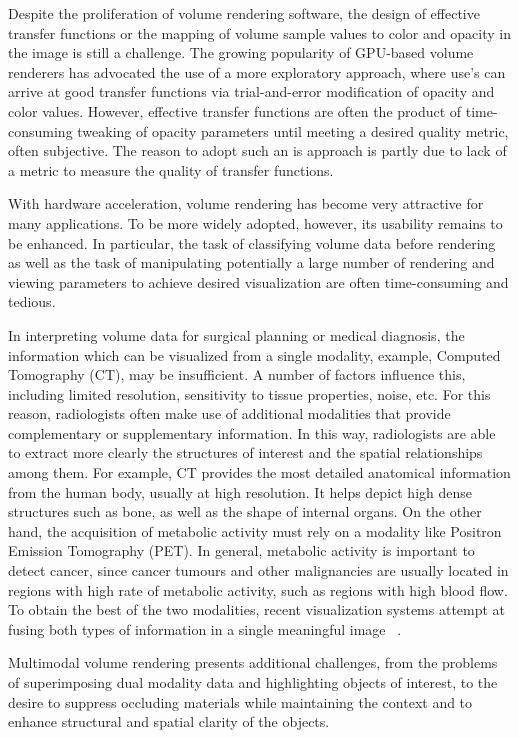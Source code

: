 Despite the proliferation of volume rendering software, the design of effective transfer functions or the mapping of volume sample values to color and opacity in the image is still a challenge. The growing popularity of GPU-based volume renderers has advocated the use of a more exploratory approach, where use\rq s can arrive at good transfer functions via trial-and-error modification of opacity and color values. However, effective transfer functions are often the product of time-consuming tweaking of opacity parameters until meeting a desired quality metric, often subjective. The reason to adopt such an is approach is partly due to lack of a metric to measure the quality of transfer functions. 

With hardware acceleration, volume rendering has become very attractive for many applications. To be more widely adopted, however, its usability remains to be enhanced. In particular, the task of classifying volume data before rendering as well as the task of manipulating potentially a large number of rendering and viewing parameters to achieve desired visualization are often time-consuming and tedious. 

In interpreting volume data for surgical planning or medical diagnosis, the information which can be visualized from a single modality, example, Computed Tomography (CT), may be insufficient. A number of factors influence this, including limited resolution, sensitivity to tissue properties, noise, etc. For this reason, radiologists often make use of additional modalities that provide complementary or supplementary information. In this way, radiologists are able to extract more clearly the structures of interest and the spatial relationships
among them. For example, CT provides the most detailed anatomical information from the human body, usually at high resolution. It helps depict high dense structures such as bone, as well as the shape of internal organs. On the other hand, the acquisition of metabolic activity must rely on a modality like Positron Emission Tomography (PET). In general, metabolic activity is important to detect cancer, since cancer tumours and other malignancies are usually located in regions with high rate of metabolic activity, such as regions with high blood flow. To obtain the best of the two modalities, recent visualization systems attempt at fusing both types of information in a single meaningful image ~\cite{895844}.

Multimodal volume rendering presents additional challenges, from the problems of superimposing dual modality data and highlighting objects of interest, to the desire to suppress occluding materials while maintaining the context and to enhance structural and spatial clarity of the objects.

